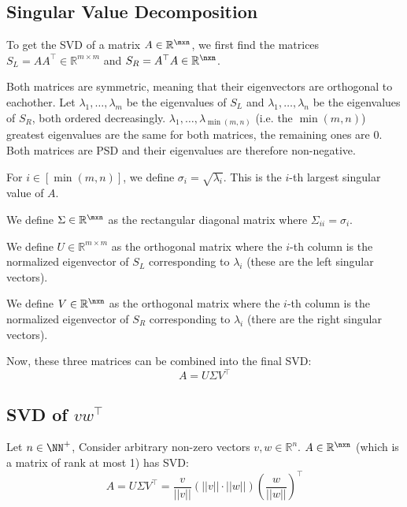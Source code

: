 \subsection{Singular Value Decomposition}
To get the SVD of a matrix $A \in \mathbb{R}^{\mxn}$, we first
find the matrices $S_L = A A^\top \in \mathbb{R}^{m \times m}$ and
$S_R = A^\top A \in \mathbb{R}^{\nxn}$.

Both matrices are symmetric, meaning that their eigenvectors are orthogonal
to eachother. Let $\lambda_1, \dots, \lambda_m$ be the eigenvalues of $S_L$
and $\lambda_1, \dots, \lambda_n$ be the eigenvalues of $S_R$, both ordered
decreasingly. $\lambda_1, \dots, \lambda_{\min(m, n)}$ (i.e. the $\min(m, n)$)
greatest eigenvalues are the same for both matrices, the remaining ones are 0.
Both matrices are PSD and their eigenvalues are therefore non-negative.

For $i \in [\min(m, n)]$, we define $\sigma_i = \sqrt{\lambda_i}$. This is the
$i$-th largest singular value of $A$. 

We define $\Sigma \in \mathbb{R}^{\mxn}$ as the rectangular diagonal matrix
where $\Sigma_{ii} = \sigma_i$.

We define $U \in \mathbb{R}^{m \times m}$ as the orthogonal matrix where the $i$-th
column is the normalized eigenvector of $S_L$ corresponding to $\lambda_i$ (these are the
left singular vectors).

We define $V \in \mathbb{R}^{\nxn}$ as the orthogonal matrix where the $i$-th
column is the normalized eigenvector of $S_R$ corresponding to $\lambda_i$ (there are the
right singular vectors).

Now, these three matrices can be combined into the final SVD: $$A = U \Sigma V^\top$$

\subsection{SVD of \texorpdfstring{$vw^\top$}{vw\^T}}
Let $n \in \NN^+$, Consider arbitrary non-zero vectors
$v, w \in \mathbb{R}^n$. $A \in \mathbb{R}^{\nxn}$ (which is a matrix of rank at most 1) has SVD:
$$A = U\Sigma V^\top = \frac{v}{||v||}(||v|| \cdot ||w||)\left(\frac{w}{||w||}\right)^\top$$

